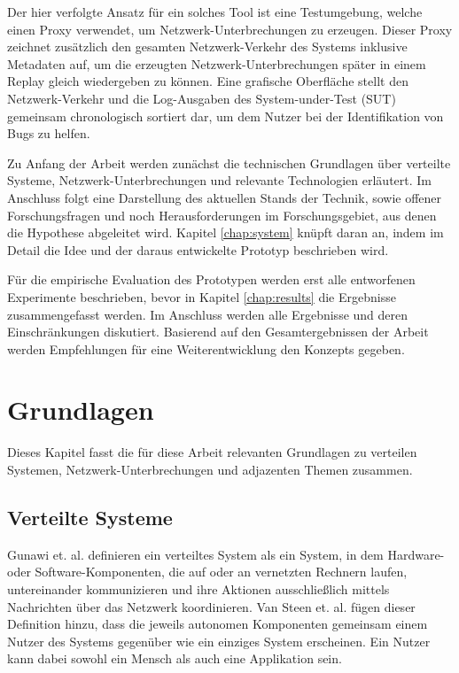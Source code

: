 \documentclass[12pt,a4paper]{report}
\begin{document}
Der hier verfolgte Ansatz für ein solches Tool ist eine Testumgebung, welche einen Proxy verwendet, um Netzwerk-Unterbrechungen zu
erzeugen. Dieser Proxy zeichnet zusätzlich den gesamten Netzwerk-Verkehr des Systems inklusive Metadaten auf, um die erzeugten
Netzwerk-Unterbrechungen später in einem Replay gleich wiedergeben zu können. Eine grafische Oberfläche stellt den
Netzwerk-Verkehr und die Log-Ausgaben des System-under-Test (SUT) gemeinsam chronologisch sortiert dar, um dem Nutzer bei
der Identifikation von Bugs zu helfen.

Zu Anfang der Arbeit werden zunächst die technischen Grundlagen über verteilte Systeme, Netzwerk-Unterbrechungen und relevante
Technologien erläutert. Im Anschluss folgt eine Darstellung des aktuellen Stands der Technik, sowie offener Forschungsfragen und
noch Herausforderungen im Forschungsgebiet, aus denen die Hypothese abgeleitet wird. Kapitel \ref{chap:system} knüpft daran an,
indem im Detail die Idee und der daraus entwickelte Prototyp beschrieben wird.

Für die empirische Evaluation des Prototypen werden erst alle entworfenen Experimente beschrieben, bevor in Kapitel
\ref{chap:results} die Ergebnisse zusammengefasst werden. Im Anschluss werden alle Ergebnisse und deren Einschränkungen
diskutiert. Basierend auf den Gesamtergebnissen der Arbeit werden Empfehlungen für eine Weiterentwicklung den Konzepts
gegeben.



\chapter{Grundlagen}
Dieses Kapitel fasst die für diese Arbeit relevanten Grundlagen zu verteilen Systemen, Netzwerk-Unterbrechungen und adjazenten
Themen zusammen.

\section{Verteilte Systeme}
Gunawi et. al. \cite{distributed_systems_concepts_and_design} definieren ein verteiltes System als ein System, in dem Hardware-
oder Software-Komponenten, die auf oder an vernetzten Rechnern laufen, untereinander kommunizieren und ihre Aktionen
ausschließlich mittels Nachrichten über das Netzwerk koordinieren. Van Steen et. al.
\cite{brief_introduction_to_distributed_systems} fügen dieser Definition hinzu, dass die jeweils autonomen Komponenten gemeinsam
einem Nutzer des Systems gegenüber wie ein einziges System erscheinen. Ein Nutzer kann dabei sowohl ein Mensch als auch eine
Applikation sein.
\end{document}
